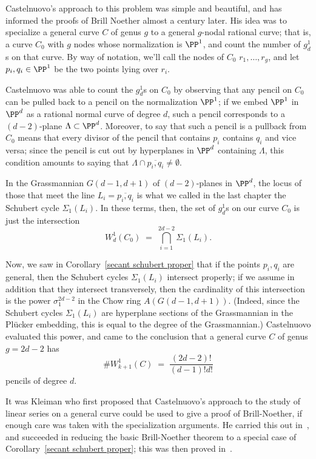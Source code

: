 Castelnuovo's approach to this problem was simple and beautiful, and has informed the proofs of Brill Noether almost a century later. His idea was to specialize a general curve $C$ of genus $g$ to a general $g$-nodal rational curve; that is, a curve $C_0$ with $g$ nodes whose normalization is $\PP^1$, and count the number of $g^1_d$s on that curve. By way of notation, we'll call the nodes of $C_0$ $r_1,\dots,r_g$, and let $p_i, q_i \in \PP^1$ be the two points lying over $r_i$.

Castelnuovo was able to count the $g^1_d$s on $C_0$ by observing that any pencil on $C_0$ can be pulled back to a pencil on the normalization $\PP^1$; if we embed $\PP^1$ in $\PP^d$ as a rational normal curve of degree $d$, such a pencil corresponds to a $(d-2)$-plane $\Lambda \subset \PP^d$. Moreover, to say that such a pencil is a pullback from $C_0$ means that every divisor of the pencil that contains $p_i$ contains $q_i$ and vice versa; since the pencil is cut out by hyperplanes in $\PP^d$ containing $\Lambda$, this condition amounts to saying that $\Lambda \cap \overline{p_i,q_i} \neq \emptyset$.

In the Grassmannian $G(d-1, d+1)$ of $(d-2)$-planes in $\PP^d$, the locus of those that meet the line $L_i = \overline{p_i,q_i}$ is what we called in the last chapter the Schubert cycle $\Sigma_1(L_i)$. In these terms, then, the set of $g^1_d$s on our curve $C_0$ is just the intersection
$$
W^1_d(C_0) \; = \; \bigcap_{i=1}^{2d-2} \Sigma_1(L_i).
$$

Now, we saw in Corollary~\ref{secant schubert proper} that if the points $p_i, q_i$ are general, then the Schubert cycles $\Sigma_1(L_i)$ intersect properly; if we assume in addition that they intersect transversely, then the cardinality of this intersection is the power $\sigma_1^{2d-2}$ in the Chow ring $A(G(d-1, d+1))$. (Indeed, since the Schubert cycles $\Sigma_1(L_i)$ are hyperplane sections of the Grassmannian in the Pl\"ucker embedding, this is equal to the degree of the Grassmannian.)
Castelnuovo evaluated this power, and came to the conclusion that a general curve $C$ of genus $g=2d-2$ has 
$$
\#W^1_{k+1}(C) \; = \; \frac{(2d-2)!}{(d-1)!d!}
$$
pencils of degree $d$.

It was Kleiman who first proposed that Castelnuovo's approach to the study of linear series on a general curve could be used to give a proof of Brill-Noether, if enough care was taken with the specialization arguments. He carried this out in~\cite{r-special}, and succeeded in reducing the basic Brill-Noether theorem to a special case of Corollary~\ref{secant schubert proper}; this was then proved in~\cite{Griffiths-Harris-BN}.

